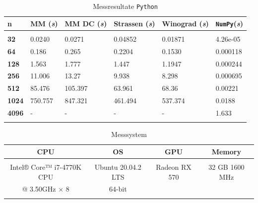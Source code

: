 	 \begin{table}
	 			 \begin{center}
	 					 \begin{tabular}{l l l l l l}
	 							 \hline
	 							 \hline
	 							 \textbf{n} & \textbf{MM (\textit{s})} &  \textbf{MM DC (\textit{s})} & \textbf{Strassen (\textit{s})}  & \textbf{Winograd (\textit{s})} & \textbf{\texttt{NumPy}(\textit{s})} \\
	 							 \hline
	 							 \multicolumn{6}{c}{} \\
	 							 \textbf{32}   & 0.0240 &0.0271 &  0.04852& 0.01871 & 4.26e-05  \\
	 							 \textbf{64}   & 0.186  & 0.265&  0.2204& 0.1530& 0.000118 \\
	 							 \textbf{128}  & 1.563   & 1.777&  1.447&  1.1947 & 0.000244 \\
	 							 \textbf{256}  & 11.006    & 13.27 & 9.938 &  8.298& 0.000695 \\
	 							 \textbf{512}  & 85.476    & 105.397 & 63.961 & 68.36 &  0.00221\\
	 							 \textbf{1024} & 750.757     & 847.321& 461.494  & 537.374 & 0.0188 \\
								 \textbf{4096} & -     & - & -  & - & 1.633 \\
	 							 \multicolumn{6}{c}{} \\
	 							 \hline
	 							 \hline
	 					 \end{tabular}
	 			 \end{center}
	 			 \caption{Messresultate \texttt{Python}}
	 			 \label{multiplikation:tab:messung_Python}
	 	 \end{table}

		 \begin{table}
		 			 \begin{center}
		 					 \begin{tabular}{c c c c}
		 							 \hline
		 							 \hline
		 							 \textbf{CPU} & \textbf{OS} &  \textbf{GPU } & \textbf{Memory }  \\
		 							 \hline
		 							 \multicolumn{4}{c}{} \\
		 							   Intel® Core™ i7-4770K CPU  & Ubuntu 20.04.2 LTS & Radeon RX 570 &  32 GB 1600 MHz   \\
										 @ 3.50GHz × 8  & 64-bit & &    \\
		 							 \multicolumn{4}{c}{} \\
		 							 \hline
		 							 \hline
		 					 \end{tabular}
		 			 \end{center}
		 			 \caption{Messsystem}
		 			 \label{multiplikation:tab:pc_config}
		 	 \end{table}

